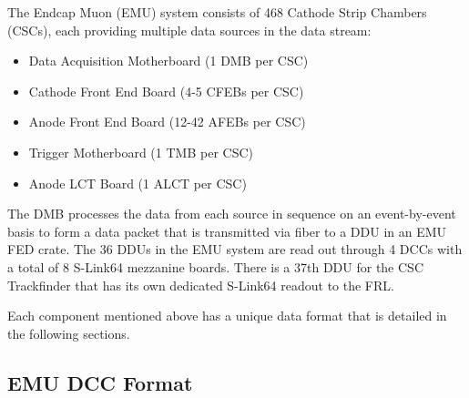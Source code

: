 The Endcap Muon (EMU) system consists of 468 Cathode Strip Chambers (CSCs),
each providing multiple data sources in the data stream:
\begin{itemize}
\item Data Acquisition Motherboard (1 DMB per CSC)
\item Cathode Front End Board (4-5 CFEBs per CSC)
\item Anode Front End Board (12-42 AFEBs per CSC)
\item Trigger Motherboard (1 TMB per CSC)
\item Anode LCT Board (1 ALCT per CSC)
\end{itemize}
The DMB processes the data from each source in sequence on an event-by-event
basis to form a data packet that is transmitted
via fiber to a DDU in an EMU FED crate.
The 36 DDUs in the EMU system are read out through 4 DCCs with a total of
8 S-Link64 mezzanine boards.  There is a 37th DDU for the CSC Trackfinder
that has its own dedicated S-Link64 readout to the FRL.

Each component mentioned above has a unique data format that is
detailed in the following sections.

\subsection{EMU DCC Format}

